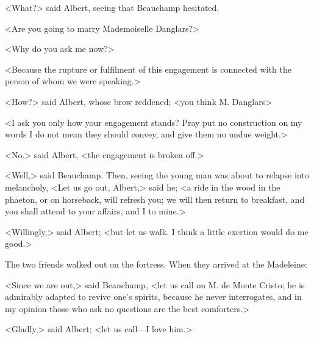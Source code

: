  <What?> said Albert, seeing that Beauchamp hesitated. 

 <Are you going to marry Mademoiselle Danglars?> 

 <Why do you ask me now?> 

 <Because the rupture or fulfilment of this engagement is connected with the person of whom we were speaking.> 

 <How?> said Albert, whose brow reddened; <you think M. Danglars\longdash> 

 <I ask you only how your engagement stands? Pray put no construction on my words I do not mean they should convey, and give them no undue weight.> 

 <No.> said Albert, <the engagement is broken off.> 

 <Well,> said Beauchamp. Then, seeing the young man was about to relapse into melancholy, <Let us go out, Albert,> said he; <a ride in the wood in the phaeton, or on horseback, will refresh you; we will then return to breakfast, and you shall attend to your affairs, and I to mine.> 

 <Willingly,> said Albert; <but let us walk. I think a little exertion would do me good.> 

 The two friends walked out on the fortress. When they arrived at the Madeleine: 

 <Since we are out,> said Beauchamp, <let us call on M. de Monte Cristo; he is admirably adapted to revive one's spirits, because he never interrogates, and in my opinion those who ask no questions are the best comforters.> 

 <Gladly,> said Albert; <let us call—I love him.> 